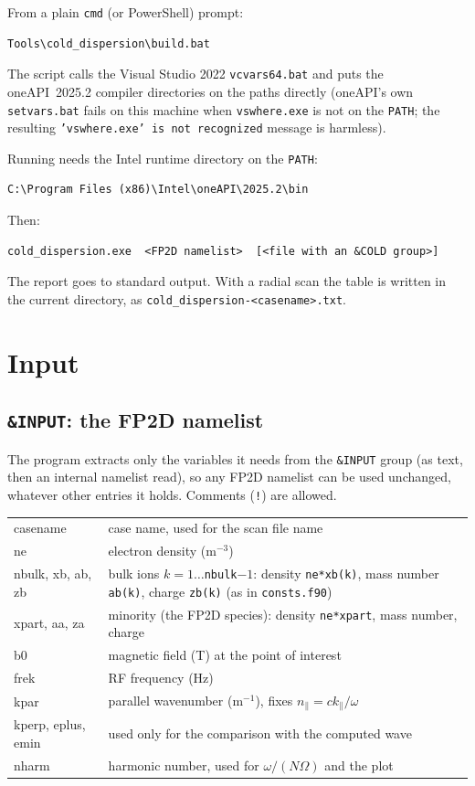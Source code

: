 \documentclass[11pt,a4paper]{article}
\newcommand{\npar}{n_\parallel}
\newcommand{\code}[1]{\texttt{#1}}
\begin{document}
From a plain \code{cmd} (or PowerShell) prompt:
\begin{lstlisting}
Tools\cold_dispersion\build.bat
\end{lstlisting}
The script calls the Visual Studio 2022 \code{vcvars64.bat} and puts the
oneAPI~2025.2 compiler directories on the paths directly (oneAPI's own
\code{setvars.bat} fails on this machine when \code{vswhere.exe} is not on the
\code{PATH}; the resulting \code{'vswhere.exe' is not recognized} message is harmless).

Running needs the Intel runtime directory on the \code{PATH}:
\begin{lstlisting}
C:\Program Files (x86)\Intel\oneAPI\2025.2\bin
\end{lstlisting}
Then:
\begin{lstlisting}
cold_dispersion.exe  <FP2D namelist>  [<file with an &COLD group>]
\end{lstlisting}
The report goes to standard output. With a radial scan the table is written
in the current directory, as \code{cold\_dispersion-<casename>.txt}.

\section{Input}

\subsection{\code{\&INPUT}: the FP2D namelist}

The program extracts only the variables it needs from the \code{\&INPUT}
group (as text, then an internal namelist read), so any FP2D namelist can be
used unchanged, whatever other entries it holds. Comments (\code{!}) are
allowed.

\begin{tabular}{@{}>{\ttfamily}l p{11cm}@{}}
\toprule
casename & case name, used for the scan file name \\
ne       & electron density (m$^{-3}$) \\
nbulk, xb, ab, zb & bulk ions $k=1\ldots$\code{nbulk}$-1$: density
            \code{ne*xb(k)}, mass number \code{ab(k)}, charge \code{zb(k)} (as in \code{consts.f90}) \\
xpart, aa, za & minority (the FP2D species): density \code{ne*xpart}, mass number, charge \\
b0       & magnetic field (T) at the point of interest \\
frek     & RF frequency (Hz) \\
kpar     & parallel wavenumber (m$^{-1}$), fixes $\npar = c k_\parallel/\omega$ \\
kperp, eplus, emin & used only for the comparison with the computed wave \\
nharm    & harmonic number, used for $\omega/(N\Omega)$ and the plot \\
\bottomrule
\end{tabular}
\end{document}

